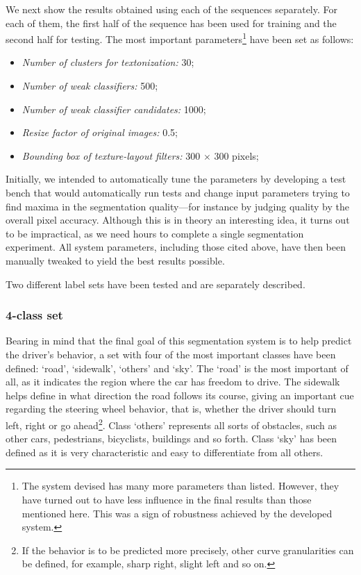 We next show the results obtained using each of the sequences separately. For each of them, the first half of the sequence has been used for training and the second half for testing. The most important parameters\footnote{The system devised has many more parameters than listed. However, they have turned out to have less influence in the final results than those mentioned here. This was a sign of robustness achieved by the developed system.} have been set as follows:

\begin{itemize}
\item \emph{Number of clusters for textonization:} 30;
\item \emph{Number of weak classifiers:} 500;
\item \emph{Number of weak classifier candidates:} 1000;
\item \emph{Resize factor of original images:} 0.5;
\item \emph{Bounding box of texture-layout filters:} 300 $\times$ 300 pixels;
\end{itemize}

Initially, we intended to automatically tune the parameters by developing a test bench that would automatically run tests and change input parameters trying to find maxima in the segmentation quality---for instance by judging quality by the overall pixel accuracy. Although this is in theory an interesting idea, it turns out to be impractical, as we need hours to complete a single segmentation experiment. All system parameters, including those cited above, have then been manually tweaked to yield the best results possible.

Two different label sets have been tested and are separately described.

\subsubsection{4-class set}
Bearing in mind that the final goal of this segmentation system is to help predict the driver's behavior, a set with four of the most important classes have been defined: `road', `sidewalk', `others' and `sky'. The `road' is the most important of all, as it indicates the region where the car has freedom to drive. The sidewalk helps define in what direction the road follows its course, giving an important cue regarding the steering wheel behavior, that is, whether the driver should turn left, right or go ahead\footnote{If the behavior is to be predicted more precisely, other curve granularities can be defined, for example, sharp right, slight left and so on.}. Class `others' represents all sorts of obstacles, such as other cars, pedestrians, bicyclists, buildings and so forth. Class `sky' has been defined as it is very characteristic and easy to differentiate from all others.

